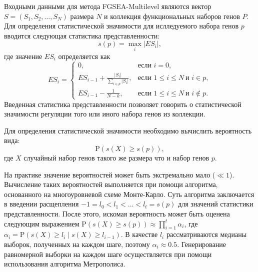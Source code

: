 Входными данными для метода FGSEA-Multilevel являются вектор $S = \left(S_1, S_2, \ldots, S_N\right)$ размера $N$ и коллекция функциональных наборов генов $P$.
Для определения статистической значимости для ислледуемого набора генов $p$ вводится следующая статистика представленности:
\[
    s(p) = \max_i \vert ES_i \vert,
\]
где значение $ES_i$ определяется как
\[
    ES_i = 
    \begin{cases}
        0, & \text{если } i = 0, \\
        ES_{i - 1} + \frac{\vert S_i \vert}{\sum\limits_{i \in p} \vert S_i \vert}, & \text{если } 1 \leqslant i \leqslant N \ \text{и } i \in p, \\
        ES_{i - 1} - \frac{1}{N - k}, & \text{если } 1 \leqslant i \leqslant N \ \text{и } i \not\in p.
    \end{cases}    
\]
Введенная статистика представленности позволяет говорить о статистической значимости регуляции того или иного набора генов из коллекции.

Для определения статистической значимости необходимо вычислить вероятность вида:
\[
    \mathrm{P} \left(s(X) \geqslant s(p) \right),
\]
где $X$ случайный набор генов такого же размера что и набор генов $p$. 

На практике значение вероятностей может быть экстремально мало ($\ll 1$). 
Вычисление таких вероятностей выполняется при помощи алгоритма, основанного на многоуровневой схеме Монте-Карло.
Суть алгоритма заключается в введении расщепления $-1 = l_0 < l_1 < \ldots < l_t = s(p)$ для значений статистики представленности.
После этого, искомая вероятность может быть оценена следующим выражением $\mathrm{P} \left(s(X) \geqslant s(p) \right) \approx \prod\limits_{i = 1}^{t} \alpha_i$, где $\alpha_i = \mathrm{P} \left(s(X) \geqslant l_i \mid s(X) \geqslant l_{i - 1} \right)$.
В качестве $l_i$ рассматриваются медианы выборок, полученных на каждом шаге, поэтому $\alpha_i \approx 0.5$.
Генерирование равномерной выборки на каждом шаге осуществляется при помощи использования алгоритма Метрополиса. 

